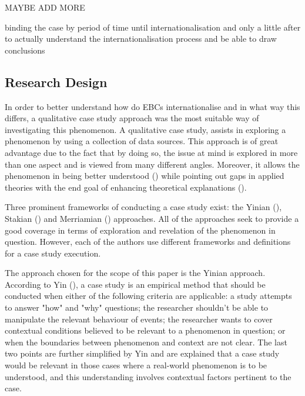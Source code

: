\documentclass[11pt,a4paper]{article}
\begin{document}
{{MAYBE ADD MORE

binding the case by period of time until internationalisation and only a little after to actually understand the internationalisation process and be able to draw conclusions

\subsection{Research Design}
In order to better understand how do EBCs internationalise and in what way this differs, a qualitative case study approach was the most suitable way of investigating this phenomenon. A qualitative case study, assists in exploring a phenomenon by using a collection of data sources. This approach is of great advantage due to the fact that by doing so, the issue at mind is explored in more than one aspect and is viewed from many different angles. Moreover, it allows the phenomenon in being better understood (\cite{baxterQualitativeCaseStudy2008}) while pointing out gaps in applied theories with the end goal of enhancing theoretical explanations (\cite{ridderCaseStudyResearch2019}). \par
Three prominent frameworks of conducting a case study exist: the Yinian (\citeyear{yinCaseStudyResearch2017}), Stakian (\citeyear{stakeArtCaseStudy1995}) and Merriamian (\citeyear{merriamQualitativeResearchCase1998}) approaches. All of the approaches seek to provide a good coverage in terms of exploration and revelation of the phenomenon in question. However, each of the authors use different frameworks and definitions for a case study execution. \par 
The approach chosen for the scope of this paper is the Yinian approach. According to Yin (\citeyear{yinCaseStudyResearch2017}), a case study is an empirical method that should be conducted when either of the following criteria are applicable: a study attempts to answer "how" and "why" questions; the researcher shouldn't be able to manipulate the relevant behaviour of events; the researcher wants to cover contextual conditions believed to be relevant to a phenomenon in question; or when the boundaries between phenomenon and context are not clear. The last two points are further simplified by Yin and are explained that a case study would be relevant in those cases where a real-world phenomenon is to be understood, and this understanding involves contextual factors pertinent to the case. \par
}}
\end{document}
